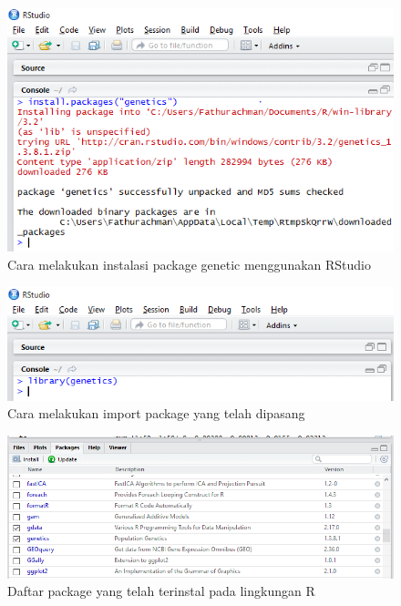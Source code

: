 \begin{figure}
\centering
\includegraphics[width=0.7\linewidth]{./pics/instalpackage}
\caption{Cara melakukan instalasi package genetic menggunakan RStudio}
\label{fig:instalpackage}
\end{figure}

\begin{figure}
\centering
\includegraphics[width=0.7\linewidth]{./pics/importpackage}
\caption{Cara melakukan import package yang telah dipasang}
\label{fig:importpackage}
\end{figure}

\begin{figure}
\centering
\includegraphics[width=0.7\linewidth]{./pics/daftarpackage}
\caption{Daftar package yang telah terinstal pada lingkungan R}
\label{fig:daftarpackage}
\end{figure}

 
